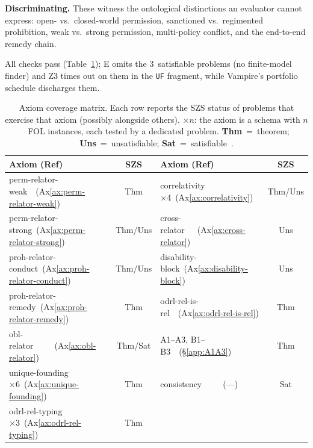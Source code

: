 \documentclass{IOS-Book-Article}
\theoremstyle{definition}
\begin{document}
\noindent\textbf{Discriminating.}
These witness the ontological distinctions an evaluator cannot express:
open- vs.\ closed-world permission, sanctioned vs.\ regimented
prohibition, weak vs.\ strong permission, multi-policy conflict, and the
end-to-end remedy chain.

\noindent All checks pass (Table~\ref{tab:results}); E omits the
3~satisfiable problems (no finite-model finder) and Z3 times out on them
in the \texttt{UF} fragment, while Vampire's portfolio schedule
discharges them.

\begin{table}[t]
\centering\scriptsize
\setlength{\tabcolsep}{3pt}
\caption{Axiom coverage matrix. Each row reports the SZS status of
  problems that exercise that axiom (possibly alongside others).
  $\times n$: the axiom is a schema with $n$~FOL instances, each
  tested by a dedicated problem.
  \textbf{Thm}~=~theorem; \textbf{Uns}~=~unsatisfiable;
  \textbf{Sat}~=~satisfiable~\cite{sutcliffe2008szs}.}
\label{tab:results}
\begin{tabular}{@{}lc@{\quad}lc@{}}
\toprule
\textbf{Axiom (Ref)} & \textbf{SZS} & \textbf{Axiom (Ref)} & \textbf{SZS} \\
\midrule
perm-relator-weak\ \ (Ax\ref{ax:perm-relator-weak})    & Thm     & correlativity ×4\ (Ax\ref{ax:correlativity})   & Thm/Uns \\
perm-relator-strong\ (Ax\ref{ax:perm-relator-strong})    & Thm/Uns & cross-relator\ \ \ (Ax\ref{ax:cross-relator}) & Uns     \\
proh-relator-conduct\ (Ax\ref{ax:proh-relator-conduct})  & Thm/Uns & disability-block\ (Ax\ref{ax:disability-block})  & Uns     \\
proh-relator-remedy\ (Ax\ref{ax:proh-relator-remedy})   & Thm     & odrl-rel-is-rel\ \ (Ax\ref{ax:odrl-rel-is-rel})& Thm     \\
obl-relator\ \ \ \ \ (Ax\ref{ax:obl-relator})   & Thm/Sat & A1--A3, B1--B3\ \ (§\ref{app:A1A3}) & Thm \\
unique-founding ×6\ (Ax\ref{ax:unique-founding})      & Thm     & consistency\ \ \ \ \ (---) & Sat     \\
odrl-rel-typing ×3\  (Ax\ref{ax:odrl-rel-typing})    & Thm     &                            &         \\
\bottomrule
\end{tabular}
\end{table}
\end{document}
